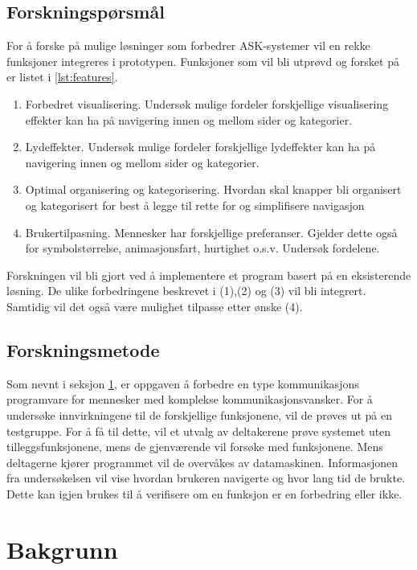 \documentclass[phd,tocprelim]{cornell}
\begin{document}
\section{Forskningspørsmål}
\label{sec:ResearchQuestion}

For å forske på mulige løsninger som forbedrer ASK-systemer vil en rekke funksjoner integreres i prototypen. Funksjoner som vil bli utprøvd og forsket på er listet i \ref{lst:features}.


\begin{enumerate} 
\label{lst:features}
\item Forbedret visualisering. Undersøk mulige fordeler forskjellige visualisering effekter kan ha på navigering innen og mellom sider og kategorier.
\item Lydeffekter. Undersøk mulige fordeler forskjellige lydeffekter kan ha på navigering innen og mellom sider og kategorier.
\item Optimal organisering og kategorisering. Hvordan skal knapper bli organisert og kategorisert for best å legge til rette for og simplifisere navigasjon
\item Brukertilpasning. Mennesker har forskjellige preferanser. Gjelder dette også for symbolstørrelse, animasjonsfart, hurtighet o.s.v. Undersøk fordelene.  
\end{enumerate} 


Forskningen vil bli gjort ved å implementere et program basert på en eksisterende løsning. De ulike forbedringene beskrevet i (1),(2) og (3) vil bli integrert. Samtidig vil det også være mulighet tilpasse etter ønske (4). 


\section{Forskningsmetode}

Som nevnt i seksjon \ref{sec:ResearchQuestion}, er oppgaven å forbedre en type kommunikasjons programvare for mennesker med komplekse kommunikasjonsvansker. For å undersøke innvirkningene til de forskjellige funksjonene, vil de prøves ut på en testgruppe.
For å få til dette, vil et utvalg av deltakerene prøve systemet uten tilleggsfunksjonene, mens de gjenværende vil forsøke med funksjonene. Mens deltagerne kjører programmet vil de overvåkes av datamaskinen. Informasjonen fra undersøkelsen vil vise hvordan brukeren navigerte og hvor lang tid de brukte. Dette kan igjen brukes til å verifisere om en funksjon er en forbedring eller ikke.


\chapter{Bakgrunn}
\end{document}
